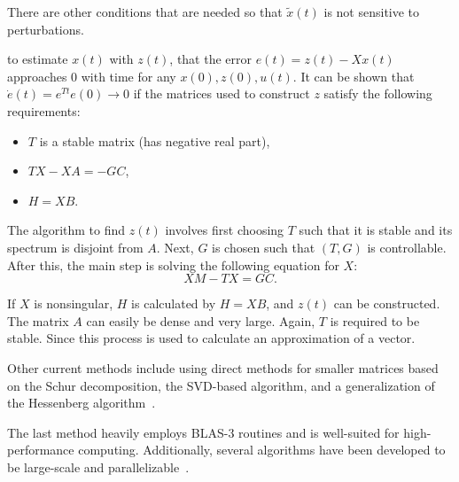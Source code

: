 \documentclass{article}
\begin{document}
There are other conditions that are needed so that $\tilde{x}(t)$ is not sensitive to perturbations. 

to estimate $x(t)$ with $z(t)$, that the error $e(t)=z(t)-X x(t)$ approaches 0 with time for any  $x(0), z(0), u(t)$. It can be shown that $\dot{e}(t)=e^{T t} e(0) \rightarrow 0$ if the matrices used to construct $z$ satisfy the following requirements:

\begin{itemize}
	\item $T$ is a stable matrix (has negative real part),
	\item $TX - XA = -GC$,
	\item $H = XB$.
\end{itemize}

The algorithm to find $z(t)$ involves first choosing $T$ such that it is stable and its spectrum is disjoint from $A$. Next, $G$ is chosen such that $(T,G)$ is controllable. After this, the main step is solving the following equation for $X$:
\[
X M - T X=G C.
\]

If $X$ is nonsingular, $H$ is calculated by $H = XB$, and $z(t)$ can be constructed. The matrix $A$ can easily be dense and very large. Again, $T$ is required to be stable. Since this process is used to calculate an approximation of a vector.

Other current methods include using direct methods for smaller matrices based on the Schur decomposition, the SVD-based algorithm, and a generalization of the Hessenberg algorithm~\cite{Carvalho}. 

The last method heavily employs BLAS-3 routines and is well-suited for high-performance computing. Additionally, several algorithms have been developed to be large-scale and parallelizable~\cite{Carvalho}.



\end{document}
